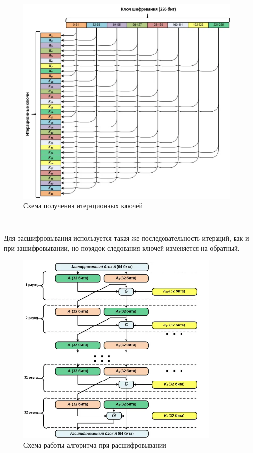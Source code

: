 \documentclass[oneside,final,14pt]{extreport}
\begin{document}
\begin{figure}[h!]
\includegraphics[width=1\textwidth]{4.png}
\caption{Схема получения итерационных ключей}

\end{figure}



~\



Для расшифровывания используется такая же последовательность итераций, как и при зашифровывании, но порядок следования ключей изменяется на обратный.\\


\begin{figure}[h!]
\includegraphics[width=0.9\textwidth]{5.png}
\caption{Схема работы алгоритма при расшифровывании}

\end{figure}
\end{document}

